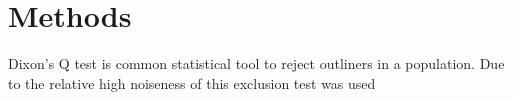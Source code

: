\chapter{Methods}

Dixon's Q test is common statistical tool to reject outliners in a population. Due to the relative high noiseness of this  exclusion test was used 